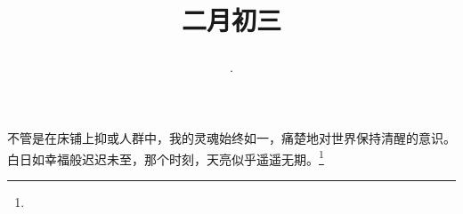 \title{\date[d=12,m=3,y=2024][year:cn-y,年,month:cn,day:cn,日,·,weekday]·二月初三 }
不管是在床铺上抑或人群中，我的灵魂始终如一，痛楚地对世界保持清醒的意识。白日如幸福般迟迟未至，那个时刻，天亮似乎遥遥无期。\footnote{ }

